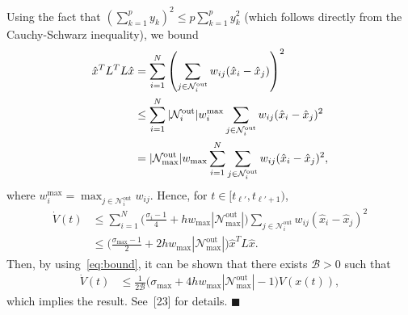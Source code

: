 \documentclass[]{book}
\newcommand{\NN}{{\mathcal{N}}}
\newcommand{\Nouti}{\mathcal{N}_i^{\operatorname{out}}}
\newcommand{\Noutmax}{\mathcal{N}_{\max}^{\operatorname{out}}}
\newcommand{\BB}{{\mathcal{B}}}
\begin{document}
Using the fact that $\left( \sum_{k=1}^p y_k \right)^2 \leq p
\sum_{k=1}^p y_k^2$ (which follows directly from the Cauchy-Schwarz
inequality), we bound
\begin{align}\label{eq:boundxx}
  \hat{x}^T L^T L \hat{x} & = \sum_{i=1}^N \left( \sum_{j \in \Nouti}
  w_{ij} (\hat{x}_i-\hat{x}_j) \right)^2 \notag
  \\
  & \le \sum_{i=1}^N |\Nouti| w^{\max}_i \sum_{j \in \Nouti} w_{ij} (\hat{x}_i -
  \hat{x}_j)^2 \notag
  \\
  & = |\Noutmax | w_{\max} \sum_{i=1}^N \sum_{j \in \Nouti} w_{ij} (\hat{x}_i -
  \hat{x}_j)^2 ,
\end{align}
where $w^{\max}_i = \max_{j \in \NN_i^\text{out}} w_{ij}$. 
Hence, for $t \in [t_{\ell'}, t_{\ell'+1})$,
\begin{align*}
  \dot{V}(t) & \leq \sum_{i=1}^N \Big( \frac{\sigma_i - 1}{4} + h
  w_{\max} |\Noutmax | \Big) \sum_{j \in \Nouti} w_{ij} (\hat{x}_i -
  \hat{x}_j)^2
  \\
  & \leq \Big( \frac{\sigma_{\max}-1}{2} + 2 h
  w_{\max} |\Noutmax | \Big) \hat{x}^T L \hat{x} .
\end{align*}
Then, by using~\eqref{eq:bound}, it can be shown that there exists $\BB > 0$
such that
\begin{align*}
  \dot{V}(t) & \leq \frac{1}{2 \BB }\Big( \sigma_{\max} + 4 h w_{\max}
  |\Noutmax | - 1 \Big) V(x(t)),
\end{align*}
which implies the result. See~[23] for details.
\hfill $\blacksquare$
\end{document}
